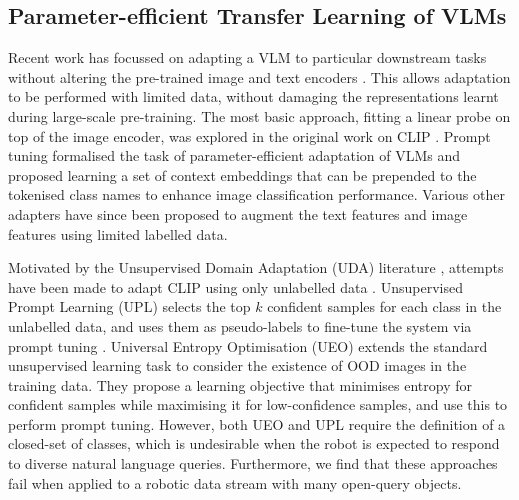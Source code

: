 \subsection{Parameter-efficient Transfer Learning of VLMs}
Recent work has focussed on adapting a VLM to particular downstream tasks without altering the pre-trained image and text encoders \cite{clip_adapter, coop, cocoop, multi_modal_adapter, vpt, tip_adapter}. This allows adaptation to be performed with limited data, without damaging the representations learnt during large-scale pre-training. The most basic approach, fitting a linear probe on top of the image encoder, was explored in the original work on CLIP \cite{clip}. Prompt tuning \cite{coop} formalised the task of parameter-efficient adaptation of VLMs and proposed learning a set of context embeddings that can be prepended to the tokenised class names to enhance image classification performance. Various other adapters have since been proposed to augment the text features \cite{coop, cocoop, tip_adapter} and image features \cite{clip_adapter, vpt} using limited labelled data. 

Motivated by the Unsupervised Domain Adaptation (UDA) literature \cite{domain_theory, uda_survey, udaod1, udaod2}, attempts have been made to adapt CLIP using only unlabelled data \cite{ueo, upl}. Unsupervised Prompt Learning (UPL) \cite{upl} selects the top $k$ confident samples for each class in the unlabelled data, and uses them as pseudo-labels to fine-tune the system via prompt tuning \cite{coop}. Universal Entropy Optimisation (UEO) \cite{ueo} extends the standard unsupervised learning task to consider the existence of OOD images in the training data. They propose a learning objective that minimises entropy for confident samples while maximising it for low-confidence samples, and use this to perform prompt tuning. However, both UEO and UPL require the definition of a closed-set of classes, which is undesirable when the robot is expected to respond to diverse natural language queries. Furthermore, we find that these approaches fail when applied to a robotic data stream with many open-query objects.  

